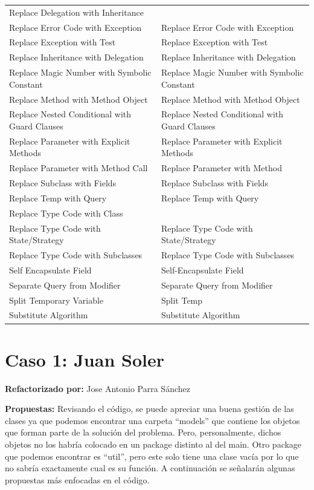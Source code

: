 \documentclass[11pt,a4paper,oneside]{book}
\begin{document}
\begin{longtable}{|p{200pt}|p{200pt}|}
    Replace Delegation with Inheritance & \\ 
    Replace Error Code with Exception & Replace Error Code with Exception\\ 
    Replace Exception with Test & Replace Exception with Test\\ 
    Replace Inheritance with Delegation & Replace Inheritance with Delegation\\ 
    Replace Magic Number with Symbolic Constant & Replace Magic Number with Symbolic Constant\\ 
    Replace Method with Method Object & Replace Method with Method Object\\ 
    Replace Nested Conditional with Guard Clauses & Replace Nested Conditional with Guard Clauses\\ 
    Replace Parameter with Explicit Methods & Replace Parameter with Explicit Methods\\ 
    Replace Parameter with Method Call & Replace Parameter with Method\\ 
    Replace Subclass with Fields & Replace Subclass with Fields\\ 
    Replace Temp with Query & Replace Temp with Query\\ 
    Replace Type Code with Class & \\ 
    Replace Type Code with State/Strategy & Replace Type Code with State/Strategy\\ 
    Replace Type Code with Subclasses & Replace Type Code with Subclasses\\ 
    Self Encapsulate Field & Self-Encapsulate Field\\ 
    Separate Query from Modifier & Separate Query from Modifier\\ 
    Split Temporary Variable & Split Temp\\ 
    Substitute Algorithm &     Substitute Algorithm\\
\end{longtable}





\chapter{Caso 1: Juan Soler}
 \textbf{Refactorizado por:} Jose Antonio Parra Sánchez \newline

\textbf{Propuestas: } Revisando el código, se puede apreciar una buena gestión de las clases ya que podemos encontrar una carpeta ``models'' que contiene los objetos que forman parte de la solución del problema. Pero, personalmente, dichos objetos no los habría colocado en un package distinto al del main. Otro package que podemos encontrar es ``util'', pero este solo tiene una clase vacía por lo que no sabría exactamente cual es su función. A continuación se señalarán algunas propuestas más enfocadas en el código.
\end{document}
